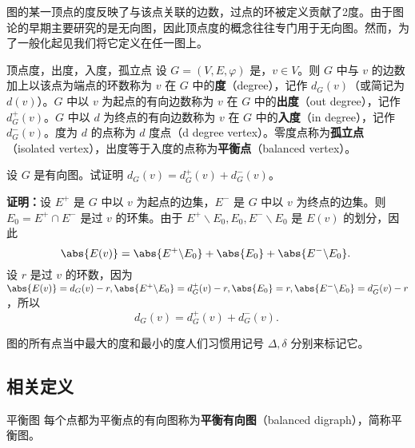

\cite{graph2}图的某一顶点的度反映了与该点关联的边数，过点的环被定义贡献了2度。由于图论的早期主要研究的是无向图，因此顶点度的概念往往专门用于无向图。然而，为了一般化起见我们将它定义在任一图上。

\begin{definition}{顶点度，出度，入度，孤立点}\label{def_DGraph_1}
设 $G=(V,E,\varphi)$ 是，$v\in V$。则 $G$ 中与 $v$ 的边数加上以该点为端点的环数称为 $v$ 在 $G$ 中的\textbf{度}（degree），记作 $d_G(v)$（或简记为 $d(v)$）。$G$ 中以 $v$ 为起点的有向边数称为 $v$ 在 $G$ 中的\textbf{出度}（out degree），记作 $d_G^+(v)$。$G$ 中以 $d$ 为终点的有向边数称为 $v$ 在 $G$ 中的\textbf{入度}（in degree），记作 $d_G^-(v)$。度为 $d$ 的点称为 $d$ 度点（d degree vertex）。零度点称为\textbf{孤立点}（isolated vertex），出度等于入度的点称为\textbf{平衡点}（balanced vertex）。
\end{definition}

\begin{example}{}
设 $G$ 是有向图。试证明 $d_G(v)=d_G^+(v)+d_G^-(v)$。

\textbf{证明：}设 $E^+$ 是 $G$ 中以 $v$ 为起点的边集，$E^-$ 是 $G$ 中以 $v$ 为终点的边集。则 $E_0=E^+\cap E^-$ 是过 $v$ 的环集。由于
$E^+\backslash E_0, E_0, E^-\backslash E_0$ 是 $E(v)$ 的划分，因此
\begin{equation}
\abs{E(v)}=\abs{E^+\backslash E_0}+\abs{E_0}+\abs{E^-\backslash E_0}.~
\end{equation}
设 $r$ 是过 $v$ 的环数，因为 $\abs{E(v)}=d_G(v)-r,\abs{E^+\backslash E_0}=d_G^+(v)-r, \abs{E_0}=r, \abs{E^-\backslash E_0}=d_G^-(v)-r$，所以
\begin{equation}
d_G(v)=d_G^+(v)+d_G^-(v).~
\end{equation}
\end{example}
图的所有点当中最大的度和最小的度人们习惯用记号 $\Delta,\delta$ 分别来标记它。
\subsection{相关定义}

\begin{definition}{平衡图}\label{def_DGraph_2}
每个点都为平衡点的有向图称为\textbf{平衡有向图}（balanced digraph），简称平衡图。
\end{definition}

